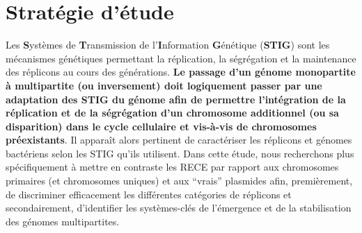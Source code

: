 \chapter{Stratégie d'étude}\label{chap2}


Les \textbf{S}ystèmes de \textbf{T}ransmission de l'\textbf{I}nformation \textbf{G}énétique (\textbf{STIG}) sont les mécanismes génétiques permettant la réplication, la ségrégation et la maintenance des réplicons au cours des générations. {\color{orange}\bf Le passage d'un génome monopartite à multipartite (ou inversement) doit logiquement passer par une adaptation des STIG du génome afin de permettre l'intégration de la réplication et de la ségrégation d'un chromosome additionnel (ou sa disparition) dans le cycle cellulaire et vis-à-vis de chromosomes préexistants}. Il apparaît alors pertinent de caractériser les réplicons et génomes bactériens selon les STIG qu'ils utilisent. Dans cette étude, nous recherchons plus spécifiquement à mettre en contraste les RECE par rapport aux chromosomes primaires (et chromosomes uniques) et aux “vrais” plasmides afin, premièrement, de discriminer efficacement les différentes catégories de réplicons et secondairement, d'identifier les systèmes-clés de l'émergence et de la stabilisation des génomes multipartites. 

